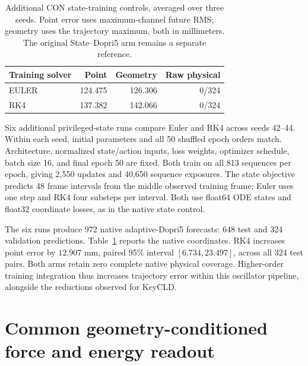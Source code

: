 \begin{table}[!t]
\caption{Additional CON state-training controls, averaged over three seeds. Point error uses maximum-channel future RMS; geometry uses the trajectory maximum, both in millimeters. The original State--Dopri5 arm remains a separate reference.}
\label{app:con-integrator-table}
\centering\small
\begin{tabular}{lrrr}
\toprule
Training solver & Point & Geometry & Raw physical\\
\midrule
EULER & 124.475 & 126.306 & 0/324 \\
RK4 & 137.382 & 142.066 & 0/324 \\
\bottomrule
\end{tabular}
\end{table}
Six additional privileged-state runs compare Euler and RK4 across seeds 42--44. Within each seed, initial parameters and all 50 shuffled epoch orders match. Architecture, normalized state/action inputs, loss weights, optimizer schedule, batch size 16, and final epoch 50 are fixed. Both train on all 813 sequences per epoch, giving 2,550 updates and 40,650 sequence exposures. The state objective predicts 48 frame intervals from the middle observed training frame; Euler uses one step and RK4 four substeps per interval. Both use float64 ODE states and float32 coordinate losses, as in the native state control.

The six runs produce 972 native adaptive-Dopri5 forecasts: 648 test and 324 validation predictions. Table~\ref{app:con-integrator-table} reports the native coordinates. RK4 increases point error by $12.907$ mm, paired 95\% interval $[6.734,23.497]$, across all 324 test pairs. Both arms retain zero complete native physical coverage. Higher-order training integration thus increases trajectory error within this oscillator pipeline, alongside the reductions observed for KeyCLD.



\section{Common geometry-conditioned force and energy readout}
\label{app:geometry-readout}

